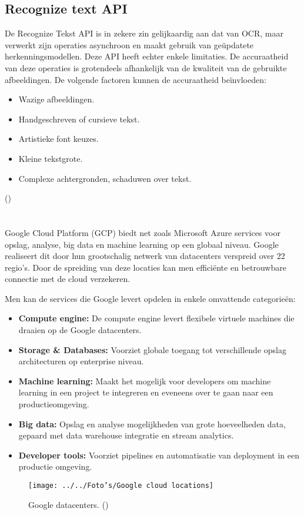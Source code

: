 \subsection{Recognize text API}
De Recognize Tekst API is in zekere zin gelijkaardig aan dat van OCR, maar verwerkt zijn operaties asynchroon en maakt gebruik van geüpdatete herkenningsmodellen. Deze API heeft echter enkele limitaties. De accuraatheid van deze operaties is grotendeels afhankelijk van de kwaliteit van de gebruikte afbeeldingen. De volgende factoren kunnen de accuraatheid beïnvloeden: 
\begin{itemize}
	\item Wazige afbeeldingen.
	\item  Handgeschreven of cursieve tekst.
	\item Artistieke font keuzes.
	\item Kleine tekstgrote.
	\item Complexe achtergronden, schaduwen over tekst.
\end{itemize}
(\cite{Microsoft2019})


\section{}
Google Cloud Platform (GCP) biedt net zoals Microsoft Azure services voor opslag, analyse, big data en machine learning op een globaal niveau. Google realiseert dit door hun grootschalig netwerk van datacenters verspreid over 22 regio’s. Door de spreiding van deze locaties kan men efficiënte en betrouwbare connectie met de cloud verzekeren. 


Men kan de services die Google levert opdelen in enkele omvattende categorieën:
\begin{itemize}
	\item \textbf{Compute engine:} De compute engine levert flexibele virtuele machines die draaien op de Google datacenters. 
	\item \textbf{Storage \& Databases:} Voorziet globale toegang tot verschillende opslag architecturen op enterprise niveau.  
	\item \textbf{Machine learning:} Maakt het mogelijk voor developers om machine learning in een project te integreren en eveneens over te gaan naar een productieomgeving.  \newpage
	\item \textbf{Big data:} Opslag en analyse mogelijkheden van grote hoeveelheden data, gepaard met data warehouse integratie en stream analytics. 
	\item \textbf{Developer tools:} Voorziet pipelines en automatisatie van deployment in een productie omgeving.
	
\end{itemize}
\begin{figure}[h]
	\texttt{[image: ../../Foto's/Google cloud locations]}
		\captionsetup{justification=centering,margin=2cm}
	\caption{Google datacenters. (\cite{Google2020a})}
	\centering
\end{figure}


